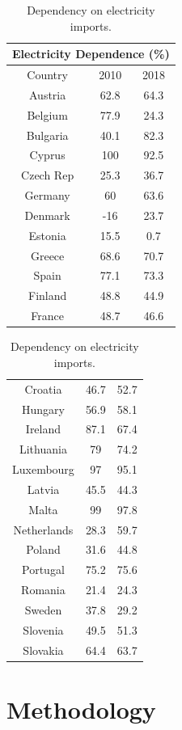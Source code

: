 \documentclass[a4paper,12pt]{book}
\begin{document}
\begin{table}[tb]
\begin{center}
\begin{tabular}{|c|c|c|}
\hline
\multicolumn{3}{|c|}{Electricity Dependence (\%) }\\
\hline
Country & 2010 & 2018 \\
\hline
Austria & 62.8 & 64.3 \\
Belgium & 77.9 & 24.3 \\
Bulgaria & 40.1 & 82.3 \\
Cyprus & 100 & 92.5 \\
Czech Rep & 25.3 & 36.7\\
Germany & 60 & 63.6 \\
Denmark & -16 & 23.7 \\
Estonia & 15.5 & 0.7 \\
Greece & 68.6 & 70.7 \\
Spain & 77.1 &  73.3 \\
Finland & 48.8 & 44.9 \\
France & 48.7 & 46.6 \\
\hline
\end{tabular}
\quad
\begin{tabular}{|c|c|c|}
\hline
Croatia & 46.7 & 52.7 \\
Hungary &  56.9 & 58.1 \\
Ireland & 87.1 & 67.4 \\
Lithuania & 79 & 74.2 \\
Luxembourg & 97 & 95.1 \\
Latvia & 45.5 & 44.3 \\
Malta & 99 & 97.8 \\
Netherlands & 28.3 & 59.7 \\
Poland & 31.6 & 44.8 \\
Portugal & 75.2 & 75.6 \\
Romania & 21.4 & 24.3 \\
Sweden & 37.8 & 29.2 \\
Slovenia & 49.5 & 51.3 \\
Slovakia & 64.4 & 63.7 \\
\hline
\end{tabular}
\end{center}
\caption{Dependency on electricity imports.}
\label{Tab:dep}
\end{table}

\chapter{Methodology}
\end{document}
